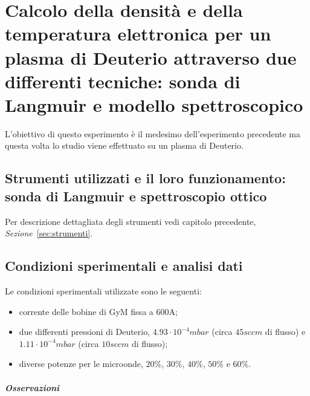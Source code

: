 \chapter{Calcolo della densità e della temperatura elettronica per un plasma di Deuterio attraverso due differenti tecniche: sonda di Langmuir e modello spettroscopico}


L'obiettivo di questo esperimento è il medesimo dell'esperimento precedente ma questa volta lo studio viene effettuato su un plasma di Deuterio.

\section{Strumenti utilizzati e il loro funzionamento: sonda di Langmuir e spettroscopio ottico}
Per descrizione dettagliata degli strumenti vedi capitolo precedente, \textit{Sezione}~\ref{sec:strumenti}.

\section{Condizioni sperimentali e analisi dati}
Le condizioni sperimentali utilizzate sono le seguenti:
\begin{itemize}
 \item corrente delle bobine di GyM fissa a $600\si{\ampere}$;
 \item due differenti pressioni di Deuterio, $4.93\cdot10^{-4}mbar$ (circa $45sccm$ di flusso) e $1.11\cdot10^{-4}mbar$ (circa $10sccm$ di flusso);
 \item diverse potenze per le microonde, $20\%$, $30\%$, $40\%$, $50\%$ e $60\%$.
\end{itemize}


\paragraph{Osservazioni} ~\\

